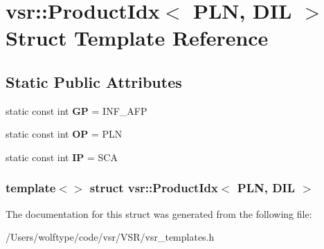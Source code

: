 \hypertarget{structvsr_1_1_product_idx_3_01_p_l_n_00_01_d_i_l_01_4}{\section{vsr\-:\-:Product\-Idx$<$ P\-L\-N, D\-I\-L $>$ Struct Template Reference}
\label{structvsr_1_1_product_idx_3_01_p_l_n_00_01_d_i_l_01_4}
}
\subsection*{Static Public Attributes}
\begin{DoxyCompactItemize}
\item 
\hypertarget{structvsr_1_1_product_idx_3_01_p_l_n_00_01_d_i_l_01_4_a1314ad1ec72eace74d381ae47fefc53e}{static const int {\bfseries G\-P} = I\-N\-F\-\_\-\-A\-F\-P}\label{structvsr_1_1_product_idx_3_01_p_l_n_00_01_d_i_l_01_4_a1314ad1ec72eace74d381ae47fefc53e}

\item 
\hypertarget{structvsr_1_1_product_idx_3_01_p_l_n_00_01_d_i_l_01_4_a8f846fe90b36a10b39882bc7b578e594}{static const int {\bfseries O\-P} = P\-L\-N}\label{structvsr_1_1_product_idx_3_01_p_l_n_00_01_d_i_l_01_4_a8f846fe90b36a10b39882bc7b578e594}

\item 
\hypertarget{structvsr_1_1_product_idx_3_01_p_l_n_00_01_d_i_l_01_4_aa65ab757d8c5be16401a15247e350258}{static const int {\bfseries I\-P} = S\-C\-A}\label{structvsr_1_1_product_idx_3_01_p_l_n_00_01_d_i_l_01_4_aa65ab757d8c5be16401a15247e350258}

\end{DoxyCompactItemize}
\subsubsection*{template$<$$>$ struct vsr\-::\-Product\-Idx$<$ P\-L\-N, D\-I\-L $>$}



The documentation for this struct was generated from the following file\-:\begin{DoxyCompactItemize}
\item 
/\-Users/wolftype/code/vsr/\-V\-S\-R/vsr\-\_\-templates.\-h\end{DoxyCompactItemize}
